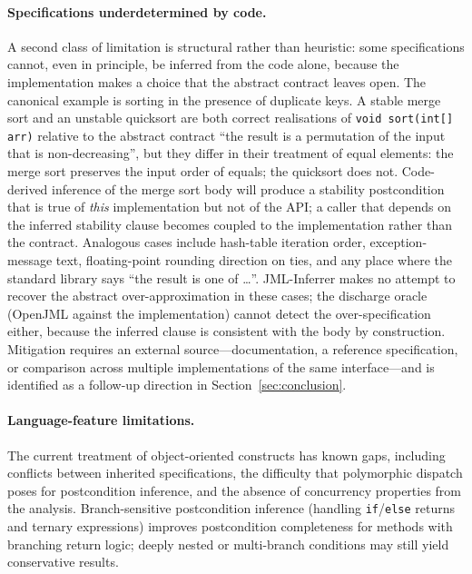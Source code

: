 \paragraph{Specifications underdetermined by code.} A second class of limitation is structural rather than heuristic: some specifications cannot, even in principle, be inferred from the code alone, because the implementation makes a choice that the abstract contract leaves open. The canonical example is sorting in the presence of duplicate keys. A stable merge sort and an unstable quicksort are both correct realisations of \texttt{void sort(int[] arr)} relative to the abstract contract ``the result is a permutation of the input that is non-decreasing'', but they differ in their treatment of equal elements: the merge sort preserves the input order of equals; the quicksort does not. Code-derived inference of the merge sort body will produce a stability postcondition that is true of \emph{this} implementation but not of the API; a caller that depends on the inferred stability clause becomes coupled to the implementation rather than the contract. Analogous cases include hash-table iteration order, exception-message text, floating-point rounding direction on ties, and any place where the standard library says ``the result is one of \dots''. JML-Inferrer makes no attempt to recover the abstract over-approximation in these cases; the discharge oracle (OpenJML against the implementation) cannot detect the over-specification either, because the inferred clause is consistent with the body by construction. Mitigation requires an external source---documentation, a reference specification, or comparison across multiple implementations of the same interface---and is identified as a follow-up direction in Section~\ref{sec:conclusion}.

\paragraph{Language-feature limitations.} The current treatment of object-oriented constructs has known gaps, including conflicts between inherited specifications, the difficulty that polymorphic dispatch poses for postcondition inference, and the absence of concurrency properties from the analysis. Branch-sensitive postcondition inference (handling \texttt{if}/\texttt{else} returns and ternary expressions) improves postcondition completeness for methods with branching return logic; deeply nested or multi-branch conditions may still yield conservative results.

